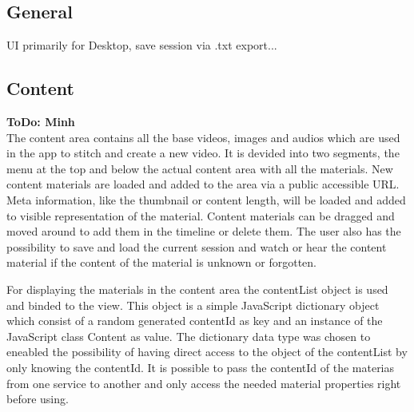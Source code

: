 \documentclass[conference]{IEEEtran}
\begin{document}
\subsection{General}
UI primarily for Desktop, save session via .txt export...

\newpage

\subsection{Content}
\textbf{ToDo: Minh} \\
The content area contains all the base videos, images and audios which are used in the app to stitch and create a new video. It is devided into two segments, the menu at the top and below the actual content area with all the materials. New content materials are loaded and added to the area via a public accessible URL. Meta information, like the thumbnail or content length, will be loaded and added to visible representation of the material. Content materials can be dragged and moved around to add them in the timeline or delete them. The user also has the possibility to save and load the current session and watch or hear the content material if the content of the material is unknown or forgotten. 

For displaying the materials in the content area the contentList object is used and binded to the view. This object is a simple JavaScript dictionary object which consist of a random generated contentId as key and an instance of the JavaScript class Content as value. The dictionary data type was chosen to eneabled the possibility of having direct access to the object of the contentList by only knowing the contentId. It is possible to pass the contentId of the materias from one service to another and only access the needed material properties right before using. 
\end{document}
